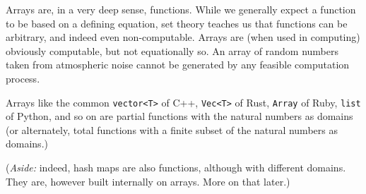 \documentclass[a4paper,11pt,notitlepage]{article}
\begin{document}
Arrays are, in a very deep sense, functions. While we generally expect a function to be based on
a defining equation, set theory teaches us that functions can be arbitrary, and indeed even non-computable.
Arrays are (when used in computing) obviously computable, but not equationally so. An array of random numbers
taken from atmospheric noise cannot be generated by any feasible computation process.

Arrays like the common \verb`vector<T>` of C++, \verb`Vec<T>` of Rust, \verb`Array` of Ruby, \verb`list`
of Python, and so on are partial functions with the natural numbers
as domains (or alternately, total functions with a finite subset of the natural numbers as domains.)

(\textit{Aside:} indeed, hash maps are also functions, although with different domains. They are, however
built internally on arrays. More on that later.)




\Last{}
\end{document}
